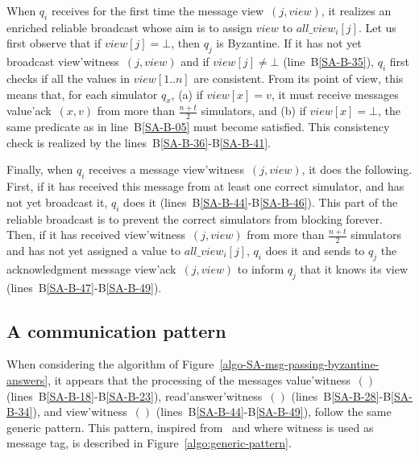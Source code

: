 \documentclass[11pt,letterpaper]{article}
\begin{document}
When $q_i$ receives for the first time the message  {\sc view}~$(j,view)$,
it realizes an enriched reliable broadcast whose aim is to assign
$view$ to $all\_view_i[j]$. Let us first observe that if $view[j]=\bot$,
then $q_j$ is Byzantine. If it has not yet broadcast
{\sc  view'witness}~$(j,view)$ and  if $view[j]\neq\bot$
(line~B\ref{SA-B-35}), $q_i$ first
checks if all the  values in  $view[1..n]$ are  consistent.
From its  point of view, this means that, for each simulator $q_x$,
(a) if $view[x]=v$, it must  receive messages {\sc value'ack}~$(x,v)$
from more than $\frac{n+t}{2}$ simulators, and (b) if  $view[x]=\bot$,
the same predicate as in line~B\ref{SA-B-05} must become satisfied.
This consistency check is realized by the lines~B\ref{SA-B-36}-B\ref{SA-B-41}.


Finally, when  $q_i$ receives a message  {\sc view'witness}~$(j,view)$,
it does the following. First, if  it has  received this message from at
least one correct simulator, and has not yet broadcast it, $q_i$ does it
(lines~B\ref{SA-B-44}-B\ref{SA-B-46}). This part of the reliable broadcast is
to prevent the correct simulators from blocking forever.
Then, if it has received  {\sc view'witness}~$(j,view)$ from more than
 $\frac{n+t}{2}$ simulators and  has not yet assigned a value to
$all\_view_i[j]$, $q_i$ does it and sends to $q_j$ the acknowledgment
message {\sc view'ack}~$(j,view)$ to inform $q_j$  that it knows its view
(lines~B\ref{SA-B-47}-B\ref{SA-B-49}).

\subsection{A communication pattern}
When considering the algorithm of
Figure~\ref{algo-SA-msg-passing-byzantine-answers}, it appears
that the  processing of the messages 
{\sc value'witness}~$()$  (lines~B\ref{SA-B-18}-B\ref{SA-B-23}), 
{\sc read'answer'witness}~$()$ (lines~B\ref{SA-B-28}-B\ref{SA-B-34}), and
{\sc view'witness}~$()$ (lines~B\ref{SA-B-44}-B\ref{SA-B-49}), 
follow the same generic pattern. 
This pattern, inspired from~\cite{B87} and 
where {\sc witness} is used as message tag, 
is described in Figure~\ref{algo:generic-pattern}.
\end{document}
